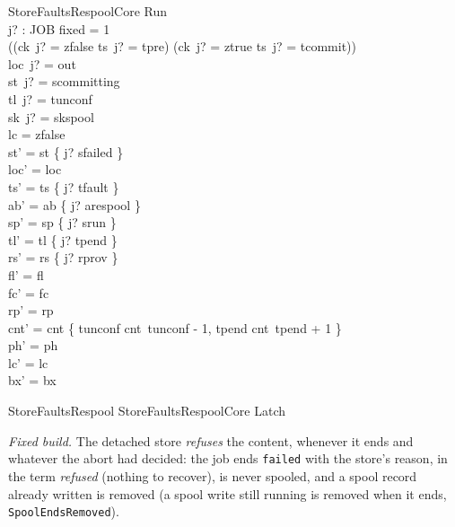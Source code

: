 \documentclass[a4paper,10pt,fleqn]{article}
\newcommand{\field}[1]{\texttt{#1}}
\begin{document}
\begin{schema}{StoreFaultsRespoolCore}
\Delta Run \\ j? : JOB
\where
fixed = 1 \\
((ck~j? = zfalse \land ts~j? = tpre) \lor (ck~j? = ztrue \land ts~j? = tcommit)) \\
loc~j? = out \\
st~j? = scommitting \\
tl~j? = tunconf \\
sk~j? = skspool \\
lc = zfalse \\
st' = st \oplus \{ j? \mapsto sfailed \} \\
loc' = loc \\
ts' = ts \oplus \{ j? \mapsto tfault \} \\
ab' = ab \oplus \{ j? \mapsto arespool \} \\
sp' = sp \oplus \{ j? \mapsto srun \} \\
tl' = tl \oplus \{ j? \mapsto tpend \} \\
rs' = rs \oplus \{ j? \mapsto rprov \} \\
fl' = fl \\
fc' = fc \\
rp' = rp \\
cnt' = cnt \oplus \{ tunconf \mapsto cnt~tunconf - 1, tpend \mapsto cnt~tpend + 1 \} \\
ph' = ph \\
lc' = lc \\
bx' = bx
\end{schema}

\begin{zed}
StoreFaultsRespool  StoreFaultsRespoolCore \land Latch
\end{zed}

\emph{Fixed build.} The detached store \emph{refuses} the content, whenever it ends
and whatever the abort had decided: the job ends \field{failed} with the store's
reason, in the term \emph{refused} (nothing to recover), is never spooled, and a
spool record already written is removed (a spool write still running is removed
when it ends, \field{SpoolEndsRemoved}).
\end{document}
